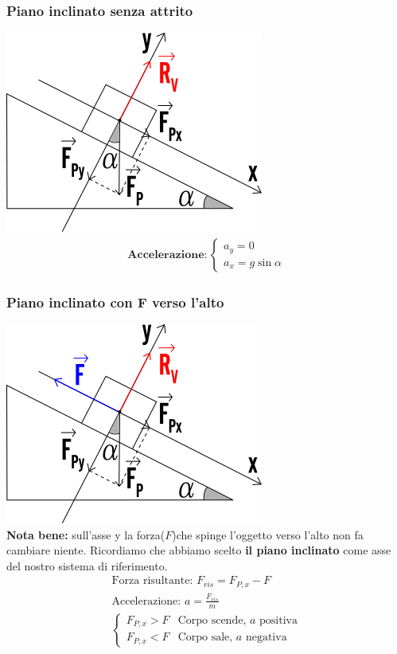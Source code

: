 \subsubsection{Piano inclinato senza attrito}
\includegraphics[width=0.75 \linewidth]{Dinamica/reazione-vincolare-nel-piano-inclinato.png} \\
\begin{gather*}
\textbf{Accelerazione}: \begin{cases}
    a_y = 0 \\
    a_x = g \sin{\alpha}
\end{cases}
\end{gather*}

\subsubsection{Piano inclinato con F verso l'alto}
\includegraphics[width=0.75 \linewidth]{Dinamica/variante-piano-inclinato-senza-attrito.png} \\
\textbf{Nota bene: } sull'asse y la forza($F$)che spinge l'oggetto verso l'alto non fa cambiare niente. Ricordiamo che abbiamo scelto \textbf{il piano inclinato} come asse del nostro sistema di riferimento.
\begin{gather*}
    \text{Forza risultante: } F_{ris} = F_{P, x} - F \\
    \text{Accelerazione: } a = \frac{F_{ris}}{m} \\
    \begin{cases}
        F_{P, x} > F & \text{Corpo scende, $a$ positiva} \\
        F_{P, x} < F & \text{Corpo sale, $a$ negativa}
    \end{cases}
\end{gather*}
